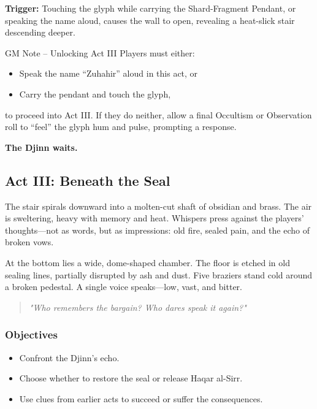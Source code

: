 \textbf{Trigger:}  
Touching the glyph while carrying the Shard-Fragment Pendant, or speaking the name aloud, causes the wall to open, revealing a heat-slick stair descending deeper.

\begin{CommentBox}{GM Note – Unlocking Act III}
    Players must either:
    \begin{itemize}
        \item Speak the name “Zuhahir” aloud in this act, or
        \item Carry the pendant and touch the glyph,
    \end{itemize}
    to proceed into Act III. If they do neither, allow a final Occultism or Observation roll to “feel” the glyph hum and pulse, prompting a response.
\end{CommentBox}

\textbf{The Djinn waits.}



\subsection{Act III: Beneath the Seal}

The stair spirals downward into a molten-cut shaft of obsidian and brass. The air is sweltering, heavy with memory and heat. Whispers press against the players' thoughts—not as words, but as impressions: old fire, sealed pain, and the echo of broken vows.

At the bottom lies a wide, dome-shaped chamber. The floor is etched in old sealing lines, partially disrupted by ash and dust. Five braziers stand cold around a broken pedestal. A single voice speaks—low, vast, and bitter.

\begin{quote}
    \textit{"Who remembers the bargain? Who dares speak it again?"}
\end{quote}

\subsubsection*{Objectives}
\begin{itemize}
    \item Confront the Djinn’s echo.
    \item Choose whether to restore the seal or release Haqar al-Sirr.
    \item Use clues from earlier acts to succeed or suffer the consequences.
\end{itemize}

